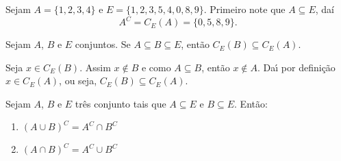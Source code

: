 \begin{exemplo}
	Sejam $A = \{1,2,3,4\}$ e $E = \{1,2,3,5,4,0,8,9\}$. Primeiro note que $A \subseteq E$, daí
	\[
			A^C = C_E(A) = \{0,5,8,9\}.
	\]
\end{exemplo}

\begin{proposicao}
	Sejam $A$, $B$ e $E$ conjuntos. Se $A\subseteq B\subseteq E$, ent{\~a}o $C_E(B)\subseteq C_E(A)$.
\end{proposicao}
\begin{prova}
	Seja $x \in C_E(B)$. Assim $x\notin B$ e como $A \subseteq B$, ent\~ao $x \notin A$. Da{\'\i} por defini\c{c}\~ao $x\in C_E(A)$, ou seja, $C_E(B) \subseteq C_E(A)$.
\end{prova}

\begin{proposicao} Sejam $A$, $B$ e $E$ tr{\^e}s conjunto tais que $A\subseteq E$ e $B\subseteq E$. Ent{\~a}o:
\begin{enumerate}[label={\roman*})]
	\item $(A\cup B)^C = A^C\cap B^C$
	\item $(A\cap B)^C = A^C\cup B^C$
\end{enumerate}
\end{proposicao}
